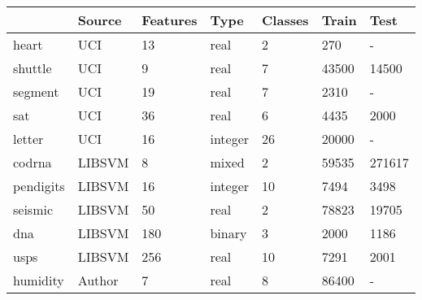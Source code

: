 \begin{tabular}{|l|llllll|}
	\hline
	& Source & Features & Type & Classes & Train & Test \\\hline
	heart & UCI & 13 & real & 2 & 270 & - \\
	shuttle & UCI & 9 & real & 7 & 43500 & 14500 \\
	segment & UCI & 19 & real & 7 & 2310 & - \\
	sat & UCI & 36 & real & 6 & 4435 & 2000 \\
	letter & UCI & 16 & integer & 26 & 20000 & - \\
	codrna & LIBSVM & 8 & mixed & 2 & 59535 & 271617 \\
	pendigits & LIBSVM & 16 & integer & 10 & 7494 & 3498 \\
	seismic & LIBSVM & 50 & real & 2 & 78823 & 19705 \\
	dna & LIBSVM & 180 & binary & 3 & 2000 & 1186 \\
	usps & LIBSVM & 256 & real & 10 & 7291 & 2001 \\
	humidity & Author & 7 & real & 8 & 86400 & - \\\hline
\end{tabular}

